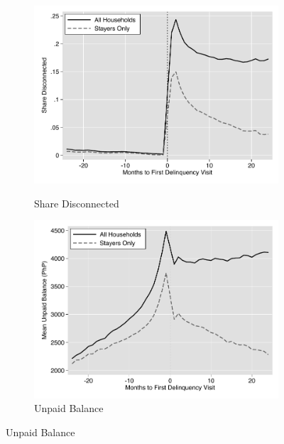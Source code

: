 \documentclass[12pt]{article}
\begin{document}
\begin{figure}[hbtp]
    \centering
    \vspace{2mm}
    \begin{subfigure}[b]{0.49\textwidth}
        \centering
        \caption[]{\small Share Disconnected}  
        \vspace{-1mm}
        \includegraphics[width=\textwidth,trim={.2cm .2cm .2cm 0cm}, clip=true]{tables/line_disconnection}
        \label{fig:line_disc}
    \end{subfigure}
    \hfill
    \begin{subfigure}[b]{0.49\textwidth}  
        \centering 
        \caption[]{\small Unpaid Balance}
        \vspace{-1mm}
        \includegraphics[width=\textwidth,trim={.2cm .2cm .2cm 0cm}, clip=true]{tables/line_bal}

\end{subfigure}
\end{figure}
\end{document}
